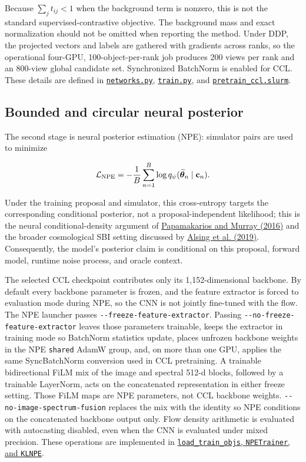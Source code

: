 \documentclass[11pt]{article}
\newcommand{\code}[1]{\nolinkurl{#1}}
\begin{document}
Because \(\sum_j t_{ij}<1\) when the background term is nonzero, this is not
the standard supervised-contrastive objective. The background mass and exact
normalization should not be omitted when reporting the method. Under DDP, the
projected vectors and labels are gathered with gradients across ranks, so the
operational four-GPU, 100-object-per-rank job produces 200 views per rank and
an 800-view global candidate set. Synchronized BatchNorm is enabled for CCL.
These details are defined in \href{../arch/networks.py}{\code{networks.py}},
\href{../arch/train.py}{\code{train.py}}, and
\href{../arch/pretrain_ccl.slurm}{\code{pretrain_ccl.slurm}}.

\subsection{Bounded and circular neural posterior}

The second stage is neural posterior estimation (NPE): simulator pairs are used
to minimize

\[
\mathcal L_{\rm NPE}=-\frac{1}{B}\sum_{n=1}^B
\log q_\psi(\widetilde{\bm\theta}_n\mid\mathbf c_n).
\]

Under the training proposal and simulator, this cross-entropy targets the
corresponding conditional posterior, not a proposal-independent likelihood;
this is the neural conditional-density argument of \hyperlink{ref:papamakarios2016}{Papamakarios and Murray (2016)} and the broader cosmological SBI setting discussed
by \hyperlink{ref:alsing2019}{Alsing et al. (2019)}. Consequently, the model's posterior
claim is conditional on this proposal, forward model, runtime noise process,
and oracle context.

The selected CCL checkpoint contributes only its 1,152-dimensional backbone.
By default every backbone parameter is frozen, and the feature extractor is
forced to evaluation mode during NPE, so the CNN is not jointly fine-tuned with
the flow. The NPE launcher passes \code{--freeze-feature-extractor}. Passing
\code{--no-freeze-feature-extractor} leaves those parameters trainable, keeps the
extractor in training mode so BatchNorm statistics update, places unfrozen
backbone weights in the NPE \code{shared} AdamW group, and, on more than one GPU,
applies the same SyncBatchNorm conversion used in CCL pretraining. A trainable
bidirectional FiLM mix of the image and spectral 512-d blocks, followed by a
trainable LayerNorm, acts on the concatenated representation in either freeze
setting. Those FiLM maps are NPE parameters, not CCL backbone weights.
\code{--no-image-spectrum-fusion} replaces the mix with the identity so NPE
conditions on the concatenated backbone output only. Flow
density arithmetic is evaluated with autocasting disabled, even when the CNN is
evaluated under mixed precision. These operations are implemented in
\href{../arch/train.py}{\code{load_train_objs}, \code{NPETrainer}, and \code{KLNPE}}.
\end{document}

